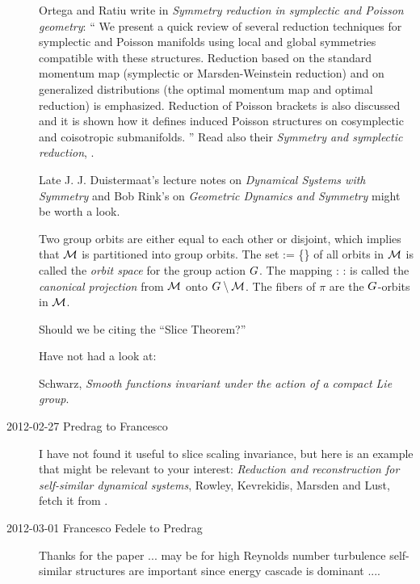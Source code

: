 \begin{description}
Ortega and Ratiu write in
\emph{Symmetry reduction in symplectic and {Poisson} geometry}: ``
We present a quick review of several reduction techniques for symplectic
and Poisson manifolds using local and global symmetries compatible with
these structures. Reduction based on the standard momentum map
(symplectic or Marsden-Weinstein reduction) and on generalized
distributions (the optimal momentum map and optimal reduction) is
emphasized. Reduction of Poisson brackets is also discussed and it is
shown how it defines induced Poisson structures on cosymplectic and
coisotropic submanifolds.
''
Read also their \emph{Symmetry and symplectic reduction}, .

Late J. J. Duistermaat's
{lecture notes} on \emph{Dynamical Systems with Symmetry} and Bob Rink's
 on
\emph{Geometric Dynamics and Symmetry} might be worth a look.

                                    \toCB
Two group orbits are either equal to each other or disjoint, which
implies that ${\cal M}$ is partitioned into group orbits. The set
\beq
\Group\setminus\pS := \left\{\Group \xInit \mid \xInit \in \pS \right\}
of all orbits in ${\cal M}$ is called the \emph{orbit space} for the group
action $G$. The mapping
\beq
\pi : \xInit \mapsto \Group \xInit : \pS \to \Group\setminus\pS
{}
is called the \emph{canonical projection} from ${\cal M}$ onto
$G\setminus{\cal M}$. The fibers of $\pi$ are the $G$-orbits in
${\cal M}$.

Should we be citing the ``Slice Theorem?''

Have not had a look at:

Schwarz,
\emph{Smooth functions invariant under the action of a compact {Lie} group}.

\item[2012-02-27 Predrag to Francesco]
I have not found it useful to slice scaling invariance, but here is an
example that might be relevant to your interest: \emph{Reduction and
reconstruction for self-similar dynamical systems}, Rowley, Kevrekidis,
Marsden and Lust, fetch it from
.

\item[2012-03-01 Francesco Fedele to Predrag]

Thanks for the paper ... may be for high Reynolds number turbulence
self-similar structures are important since energy cascade is dominant
....


\end{description}
